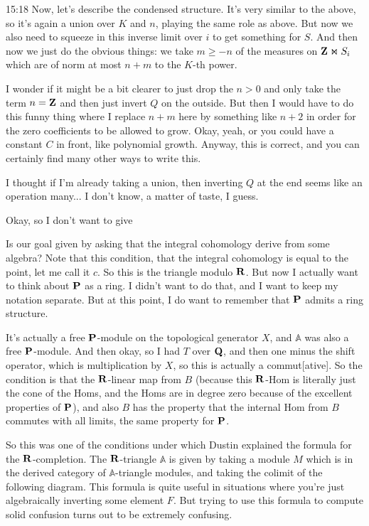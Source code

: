\begin{unfinished}{15:18}
Now, let's describe the condensed structure. It's very similar to the above, so it's again a union over $K$ and $n$, playing the same role as above. But now we also need to squeeze in this inverse limit over $i$ to get something for $S$. And then now we just do the obvious things: we take $m \geq -n$ of the measures on $\Z \Join S_i$ which are of norm at most $n + m$ to the $K$-th power.

I wonder if it might be a bit clearer to just drop the $n > 0$ and only take the term $n = \Z$ and then just invert $Q$ on the outside. But then I would have to do this funny thing where I replace $n + m$ here by something like $n + 2$ in order for the zero coefficients to be allowed to grow. Okay, yeah, or you could have a constant $C$ in front, like polynomial growth. Anyway, this is correct, and you can certainly find many other ways to write this.

I thought if I'm already taking a union, then inverting $Q$ at the end seems like an operation many... I don't know, a matter of taste, I guess.

Okay, so I don't want to give

Is our goal given by asking that the integral cohomology derive from some algebra? Note that this condition, that the integral cohomology is equal to the point, let me call it $c$. So this is the triangle modulo $\R$. But now I actually want to think about $\P$ as a ring. I didn't want to do that, and I want to keep my notation separate. But at this point, I do want to remember that $\P$ admits a ring structure.

It's actually a free $\P$-module on the topological generator $X$, and $\mathbb{A}$ was also a free $\P$-module. And then okay, so I had $T$ over $\Q$, and then one minus the shift operator, which is multiplication by $X$, so this is actually a commut[ative]. So the condition is that the $\R$-linear map from $B$ (because this $\R$-Hom is literally just the cone of the Homs, and the Homs are in degree zero because of the excellent properties of $\P$), and also $B$ has the property that the internal Hom from $B$ commutes with all limits, the same property for $\P$.

So this was one of the conditions under which Dustin explained the formula for the $\R$-completion. The $\R$-triangle $\mathbb{A}$ is given by taking a module $M$ which is in the derived category of $\mathbb{A}$-triangle modules, and taking the colimit of the following diagram. This formula is quite useful in situations where you're just algebraically inverting some element $F$. But trying to use this formula to compute solid confusion turns out to be extremely confusing.


\end{unfinished}
